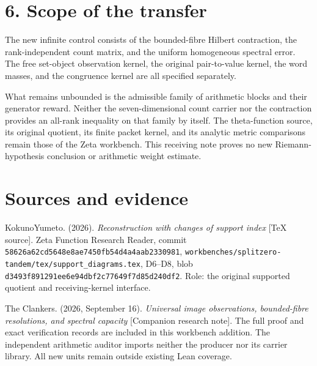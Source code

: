 \section{6. Scope of the transfer}\label{n25-scope-of-the-transfer}

The new infinite control consists of the bounded-fibre Hilbert contraction, the rank-independent count matrix, and the uniform homogeneous spectral error. The free set-object observation kernel, the original pair-to-value kernel, the word masses, and the congruence kernel are all specified separately.

What remains unbounded is the admissible family of arithmetic blocks and their generator reward. Neither the seven-dimensional count carrier nor the contraction provides an all-rank inequality on that family by itself. The theta-function source, its original quotient, its finite packet kernel, and its analytic metric comparisons remain those of the Zeta workbench. This receiving note proves no new Riemann-hypothesis conclusion or arithmetic weight estimate.

\section{Sources and evidence}\label{n25-sources-and-evidence}

KokunoYumeto. (2026). \emph{Reconstruction with changes of support index} {[}TeX source{]}. Zeta Function Research Reader, commit \nolinkurl{58626a62cd5648e8ae7450fb54d4a4aab2330981}, \nolinkurl{workbenches/splitzero-tandem/tex/support_diagrams.tex}, D6--D8, blob \nolinkurl{d3493f891291ee6e94dbf2c77649f7d85d240df2}. Role: the original supported quotient and receiving-kernel interface.

The Clankers. (2026, September 16). \emph{Universal image observations, bounded-fibre resolutions, and spectral capacity} {[}Companion research note{]}. The full proof and exact verification records are included in this workbench addition. The independent arithmetic auditor imports neither the producer nor its carrier library. All new units remain outside existing Lean coverage.

